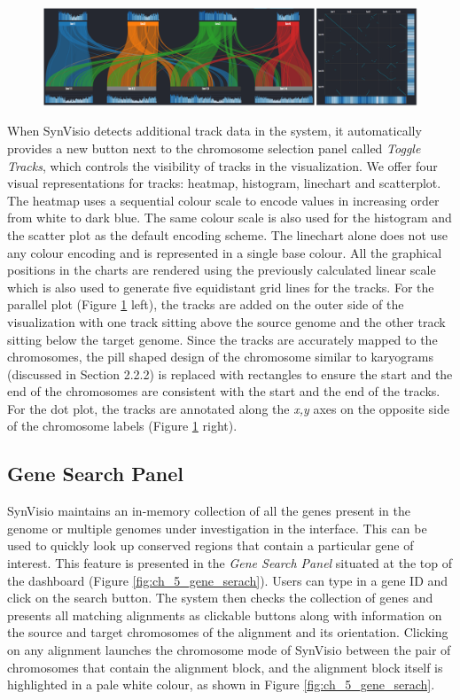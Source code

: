 \begin{figure}
  \centering
  \includegraphics[width=1\linewidth]{images/ch_5_tracks.PNG}
  \label{fig:ch_5_tracks}
\end{figure}
When SynVisio detects additional track data in the system, it automatically provides a new button next to the chromosome selection panel called \textit{Toggle Tracks}, which controls the visibility of tracks in the visualization. We offer four visual representations for tracks: heatmap, histogram, linechart and scatterplot. The heatmap uses a sequential colour scale to encode values in increasing order from white to dark blue. The same colour scale is also used for the histogram and the scatter plot as the default encoding scheme. The linechart alone does not use any colour encoding and is represented in a single base colour. All the graphical positions in the charts are rendered using the previously calculated linear scale which is also used to generate five equidistant grid lines for the tracks. For the parallel plot (Figure \ref{fig:ch_5_tracks} left), the tracks are added on the outer side of the visualization with one track sitting above the source genome and the other track sitting below the target genome. Since the tracks are accurately mapped to the chromosomes, the pill shaped design of the chromosome similar to karyograms (discussed in Section 2.2.2) is replaced with rectangles to ensure the start and the end of the chromosomes are consistent with the start and the end of the tracks. For the dot plot, the tracks are annotated along the \textit{x,y} axes on the opposite side of the chromosome labels (Figure \ref{fig:ch_5_tracks} right).


\subsection{Gene Search Panel}
SynVisio maintains an in-memory collection of all the genes present in the genome or multiple genomes under investigation in the interface. This can be used to quickly look up conserved regions that contain a particular gene of interest. This feature is presented in the \textit{Gene Search Panel} situated at the top of the dashboard (Figure \ref{fig:ch_5_gene_serach}). Users can type in a gene ID and click on the search button. The system then checks the collection of genes and presents all matching alignments as clickable buttons along with information on the source and target chromosomes of the alignment and its orientation. Clicking on any alignment launches the chromosome mode of SynVisio between the pair of chromosomes that contain the alignment block, and the alignment block itself is highlighted in a pale white colour, as shown in Figure \ref{fig:ch_5_gene_serach}. 

